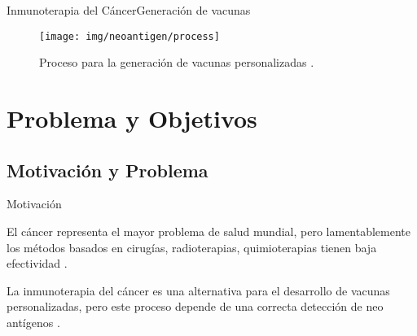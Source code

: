 \documentclass[10pt]{beamer}
\newcommand{\1}{
	\setbeamertemplate{background}{
		\texttt{[image: img/1]}
		\tikz[overlay] \fill[fill opacity=0.75,fill=white] (0,0) rectangle (-\paperwidth,\paperheight);
	}
}
\begin{document}
\begin{frame}{Inmunoterapia del Cáncer}{Generación de vacunas}	
	\begin{figure}
		\texttt{[image: img/neoantigen/process]}
		\caption{Proceso para la generación de vacunas personalizadas \cite{peng2019neoantigen}.}
	\end{figure}		
\end{frame}


\section{Problema y Objetivos}

\subsection{Motivación y Problema}

\begin{frame}{Motivación}{}	

\begin{block}{}
	El cáncer representa el mayor problema de salud mundial, pero lamentablemente los métodos basados en cirugías, radioterapias, quimioterapias tienen baja efectividad \cite{peng2019neoantigen}.
\end{block}	

\begin{block}{}
	La inmunoterapia del cáncer es una alternativa para el desarrollo de vacunas personalizadas, pero este proceso depende de una correcta detección de neo antígenos \cite{de2020neoantigen, peng2019neoantigen}.
\end{block}

\end{frame}
\end{document}
